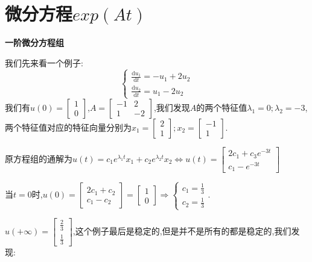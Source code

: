 \documentclass[oneside]{book}
\begin{document}
	\chapter{微分方程$exp(At)$}
	\textbf{一阶微分方程组}
	
	我们先来看一个例子:
	\begin{equation}
		\left\{\begin{array}{c}
		\frac{\mathrm{d}u_{1}}{\mathrm{d}t}=-u_{1}+2u_{2}\\ \frac{\mathrm{d}u_{2}}{\mathrm{d}t}=u_{1}-2u_{2}
		\end{array}\right.
	\end{equation}
	我们有$u(0)=\left[\begin{array}{c}
		1\\0
	\end{array}\right]$,$A=\left[\begin{array}{cc}
	-1&2\\1&-2
\end{array}\right]$,我们发现$A$的两个特征值$\lambda_{1}=0;\lambda_{2}=-3$,两个特征值对应的特征向量分别为$x_{1}=\left[\begin{array}{c}
2\\1
\end{array}\right];x_{2}=\left[\begin{array}{c}
-1\\1
\end{array}\right]$.

原方程组的通解为$u(t)=c_{1}\textit{e}^{\lambda_{1} t}x_{1}+c_{2}\textit{e}^{\lambda_{2} t}x_{2}\Leftrightarrow u(t)=\left[\begin{array}{c}
	2c_{1}+c_{3}\textit{e}^{-3t}\\c_{1}-\textit{e}^{-3t}
\end{array}\right]$

当$t=0$时,$u(0)=\left[\begin{array}{c}
	2c_{1}+c_{2}\\c_{1}-c_{2}
\end{array}\right]=\left[\begin{array}{c}
1\\0
\end{array}\right]\Rightarrow \left\{\begin{array}{c}
	c_{1}=\frac{1}{3}\\c_{2}=\frac{1}{3}
\end{array}\right.$.

$u(+\infty)=\left[\begin{array}{c}
	\frac{2}{3}\\\frac{1}{3}
\end{array}\right]$,这个例子最后是稳定的,但是并不是所有的都是稳定的,我们发现:
\end{document}
